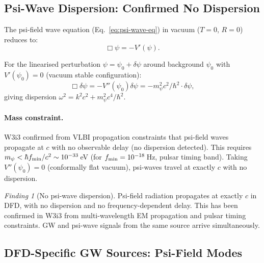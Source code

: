 \documentclass[11pt]{article}
\theoremstyle{definition}
\theoremstyle{remark}
\newtheorem{finding}[theorem]{Finding}
\begin{document}
\subsection{Psi-Wave Dispersion: Confirmed No Dispersion}

The psi-field wave equation (Eq.~\eqref{eq:psi-wave-eq}) in vacuum ($T = 0$,
$R = 0$) reduces to:
\begin{equation}
\Box\psi = -V'(\psi).
\end{equation}

For the linearised perturbation $\psi = \psi_0 + \delta\psi$ around background
$\psi_0$ with $V'(\psi_0) = 0$ (vacuum stable configuration):
\begin{equation}
\Box\delta\psi = -V''(\psi_0) \delta\psi = -m_\psi^2 c^2/\hbar^2 \cdot \delta\psi,
\end{equation}
giving dispersion $\omega^2 = k^2 c^2 + m_\psi^2 c^4/\hbar^2$.

\paragraph{Mass constraint.}
W3i3 confirmed from VLBI propagation constraints that psi-field waves
propagate at $c$ with no observable delay (no dispersion detected).
This requires $m_\psi < \hbar f_{\rm min}/c^2 \sim 10^{-33}$\,eV
(for $f_{\rm min} = 10^{-18}$\,Hz, pulsar timing band).
Taking $V''(\psi_0) = 0$ (conformally flat vacuum), psi-waves travel
at exactly $c$ with no dispersion.

\begin{finding}[No psi-wave dispersion]
Psi-field radiation propagates at exactly $c$ in DFD, with no dispersion
and no frequency-dependent delay.  This has been confirmed in W3i3 from
multi-wavelength EM propagation and pulsar timing constraints.
GW and psi-wave signals from the same source arrive simultaneously.
\end{finding}

\subsection{DFD-Specific GW Sources: Psi-Field Modes}
\end{document}
